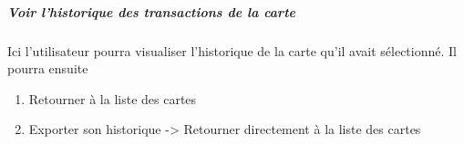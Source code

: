 \documentclass{article}
\begin{document}
\subparagraph{Voir l'historique des transactions de la carte}
Ici l'utilisateur pourra visualiser l'historique de la carte qu'il avait sélectionné.
Il pourra ensuite
\begin{enumerate}
    \item Retourner à la liste des cartes
    \item Exporter son historique -> Retourner directement à la liste des cartes
\end{enumerate}
\end{document}

